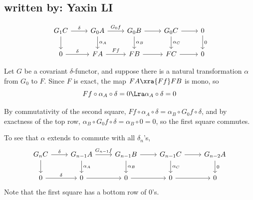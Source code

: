 \subsection{written by: Yaxin LI}
\[ 
\begin{tikzcd}
    G_1C \arrow[r, "\delta"] \arrow[d] & G_0A \arrow[r, "G_0f"] \arrow[d, "\alpha_A"] & G_0B \arrow[r] \arrow[d, "\alpha_B"] & G_0C \arrow[r] \arrow[d, "\alpha_C"] & 0 \arrow[d, "0"] \\
    0 \arrow[r, "\delta"]              & FA \arrow[r, "Ff"]                         & FB \arrow[r]                         & FC \arrow[r]                         & 0               
    \end{tikzcd}
\]

Let $G$ be a covariant $\delta$-functor, and suppose there is a natural transformation $\alpha$ from $G_0$ to $F$. Since $F$ is exact, the map $FA\xra{Ff}FB$ is mono, so \[Ff\circ\alpha_A\circ\delta=0\Lra\alpha_A\circ\delta=0\]

By commutativity of the second square, $Ff\circ\alpha_A\circ\delta=\alpha_B\circ G_0f\circ\delta$, and by exactness of the top row, $\alpha_B\circ G_0f\circ\delta=\alpha_B\circ0=0$, so the first square commutes.

To see that $\alpha$ extends to commute with all $\delta_n$'s,
\[
\begin{tikzcd}
    G_nC \arrow[r, "\delta"] \arrow[d] & G_{n-1}A \arrow[r, "G_{n-1}f"] \arrow[d, "\alpha_A"] & G_{n-1}B \arrow[r] \arrow[d, "\alpha_B"] & G_{n-1}C \arrow[r] \arrow[d, "\alpha_C"] & G_{n-2}A \arrow[d, "0"] \\
    0 \arrow[r, "\delta"]              & 0 \arrow[r]                                          & 0 \arrow[r]                              & 0 \arrow[r]                              & 0                      
    \end{tikzcd}
\]
Note that the first square has a bottom row of 0's.